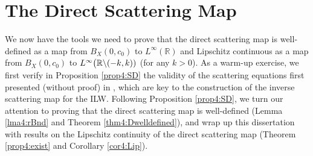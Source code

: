\documentclass[../dissertation.tex]{subfiles}
\begin{document}
\section{The Direct Scattering Map}\label{sec4:DM}

We now have the tools we need to prove that the direct scattering map is well-defined
as a map from $B_X(0, c_0)$ to $L^\infty(\mathbb R)$ and Lipschitz continuous 
as a map from $B_X(0, c_0)$ to $L^\infty\big(\mathbb R \backslash (-k,k)\mathbb)$ 
(for any $k > 0$). As a warm-up exercise, we first verify in
Proposition \ref{prop4:SD} the validity of the scattering equations first 
presented (without proof) in \cite{Kodama1982}, which are key to the 
construction of the inverse scattering map for the ILW. Following Proposition 
\ref{prop4:SD}, we turn our attention to proving that the direct scattering map 
is well-defined (Lemma \ref{lma4:rBnd} and Theorem \ref{thm4:Dwelldefined}), and
wrap up this dissertation with results on the Lipschitz continuity of the direct
scattering map (Theorem \ref{prop4:exist} and Corollary \ref{cor4:Lip}).
\end{document}
